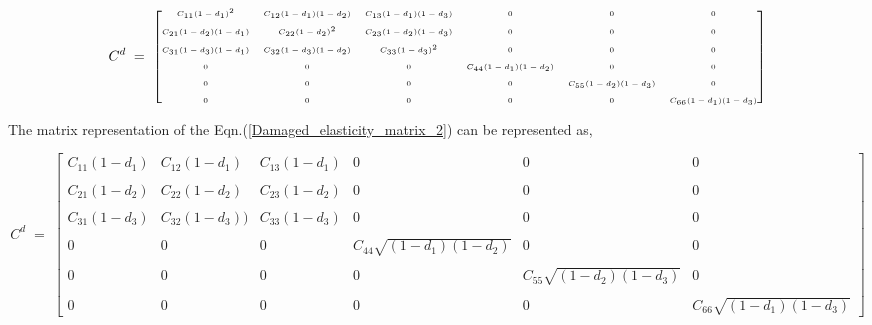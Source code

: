 \begin{tiny}
\begin{equation*}
 \tiny{C^{d} \; = \; 
  \begin{bmatrix}
  C_{11}(1 - d_{1})^{2} & C_{12}(1 - d_{1})(1 - d_{2}) & C_{13}(1 - d_{1})(1 - d_{3})  & 0 & 0 & 0 \\
  \\
  C_{21}(1 - d_{2})(1 - d_{1}) & C_{22}(1 - d_{2})^{2}  & C_{23}(1 - d_{2})(1 - d_{3}) & 0 & 0 & 0 \\
 \\  
  C_{31}(1 - d_{3})(1 - d_{1}) & C_{32}(1 - d_{3})(1 - d_{2}) & C_{33}(1 - d_{3})^{2}  & 0 & 0 & 0 \\
  \\
  0 & 0 & 0 & C_{44}(1 - d_{1})(1 - d_{2})   & 0 & 0 \\
  \\
  0 & 0 & 0 & 0 & C_{55}(1 - d_{2})(1 - d_{3}) & 0 \\
  \\
  0& 0 & 0 & 0 & 0 & C_{66}(1 - d_{1})(1 - d_{3}) 
 \end{bmatrix}}
\end{equation*}

\end{tiny}


The matrix representation of the Eqn.(\ref{Damaged_elasticity_matrix_2}) can be represented as,
\begin{tiny}
\begin{equation*}
 C^{d} \; = \; 
 \begin{bmatrix}
  C_{11}(1 - d_{1}) & C_{12}(1 - d_{1}) & C_{13}(1 - d_{1})  & 0 & 0 & 0 \\
  \\
  C_{21}(1 - d_{2}) & C_{22}(1 - d_{2})  & C_{23}(1 - d_{2}) & 0 & 0 & 0 \\
 \\  
  C_{31}(1 - d_{3}) & C_{32}(1 - d_{3})) & C_{33}(1 - d_{3})  & 0 & 0 & 0 \\
  \\
  0 & 0 & 0 & C_{44} \sqrt{(1 - d_{1})(1 - d_{2})}   & 0 & 0 \\
  \\
  0 & 0 & 0 & 0 & C_{55}\sqrt{(1 - d_{2})(1 - d_{3})} & 0 \\
  \\
  0& 0 & 0 & 0 & 0 & C_{66}\sqrt{(1 - d_{1})(1 - d_{3})}
 \end{bmatrix}
\end{equation*}

\end{tiny}

